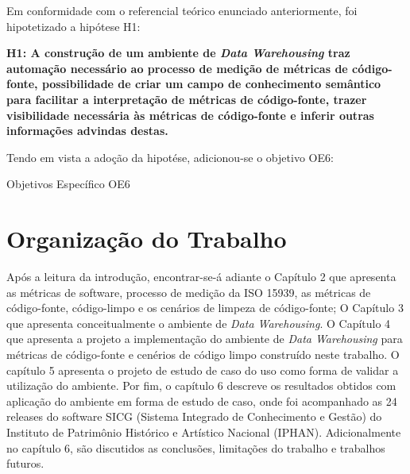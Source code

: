 Em conformidade com o referencial teórico enunciado anteriormente, foi hipotetizado a hipótese H1:

\textbf{H1: A construção de um ambiente de \textit{Data Warehousing} traz automação necessário ao processo de medição de métricas de código-fonte, possibilidade de criar um campo de conhecimento semântico para facilitar a interpretação de métricas de código-fonte, trazer visibilidade necessária às métricas de código-fonte e inferir outras informações advindas destas.} 

Tendo em vista a adoção da hipotése, adicionou-se o objetivo OE6:
\begin{table}[H]
\centering

\caption{Objetivos Específico OE6}
\label{tbl:obj} 
\end{table}
\FloatBarrier


\section{Organização do Trabalho}

Após a leitura da introdução, encontrar-se-á adiante o Capítulo 2 que apresenta as 
métricas de software, processo de medição da ISO 15939, 
as métricas de código-fonte, código-limpo e os cenários de limpeza de código-fonte; O Capítulo 3 que apresenta conceitualmente o ambiente de \textit{Data Warehousing}. O Capítulo 4 que apresenta a projeto  a implementação do ambiente de \textit{Data Warehousing} para métricas de código-fonte e cenérios de código limpo construído neste trabalho. O capítulo 5 apresenta o projeto de estudo de caso do uso como forma de validar a utilização do ambiente. Por fim, o capítulo 6 descreve os resultados obtidos com aplicação do ambiente em forma de estudo de caso, onde foi acompanhado as 24 releases do software SICG (Sistema Integrado de Conhecimento e Gestão) do Instituto de Patrimônio Histórico e Artístico Nacional (IPHAN). Adicionalmente no capítulo 6, são discutidos as conclusões, limitações do trabalho e trabalhos futuros.   